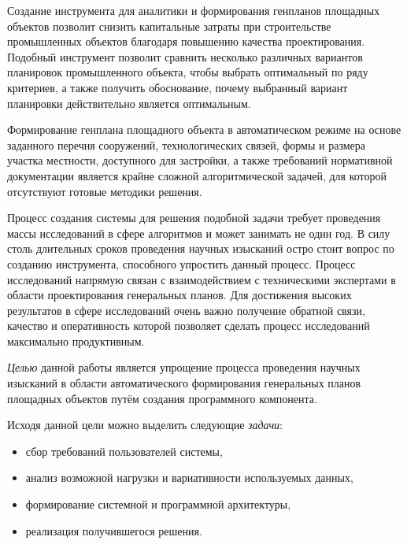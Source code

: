Создание инструмента для аналитики и формирования генпланов площадных объектов позволит снизить
капитальные затраты при строительстве промышленных объектов благодаря повышению качества проектирования.
Подобный инструмент позволит сравнить несколько различных вариантов планировок промышленного объекта,
чтобы выбрать оптимальный по ряду критериев, а также получить обоснование,
почему выбранный вариант планировки действительно является оптимальным.

Формирование генплана площадного объекта в автоматическом режиме
на основе заданного перечня сооружений, технологических связей,
формы и размера участка местности, доступного для застройки,
а также требований нормативной документации является
крайне сложной алгоритмической задачей, для которой отсутствуют готовые методики решения.

Процесс создания системы для решения подобной задачи требует
проведения массы исследований в сфере алгоритмов и может занимать не один год.
В силу столь длительных сроков проведения научных изысканий остро стоит вопрос по созданию инструмента,
способного упростить данный процесс.
Процесс исследований напрямую связан с взаимодействием с техническими экспертами
в области проектирования генеральных планов.
Для достижения высоких результатов в сфере исследований очень важно получение обратной связи,
качество и оперативность которой позволяет сделать процесс исследований максимально продуктивным.

\textit{Целью} данной работы является
упрощение процесса проведения научных изысканий
в области автоматического формирования генеральных планов площадных объектов
путём создания программного компонента.

Исходя данной цели можно выделить следующие \textit{задачи}:
\begin{itemize}
    \item сбор требований пользователей системы,
    \item анализ возможной нагрузки и вариативности используемых данных,
    \item формирование системной и программной архитектуры,
    \item реализация получившегося решения.
\end{itemize}

